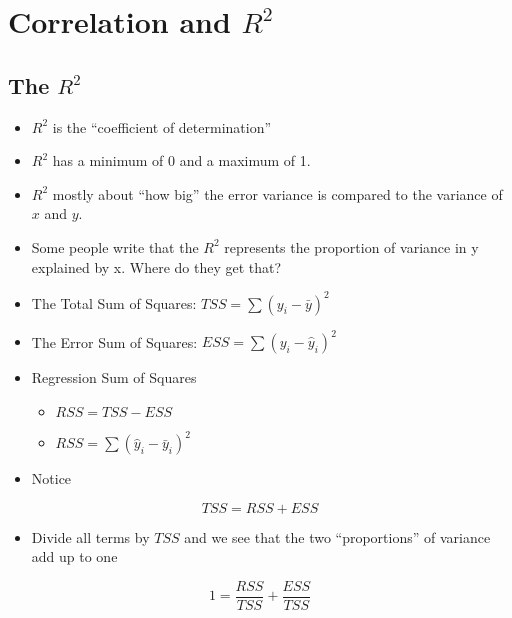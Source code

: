 \documentclass[10pt,english]{beamer}
\def\lyxframeend{} %
\begin{document}
\lyxframeend{}\section{Correlation and $R^{2}$}


\lyxframeend{}\subsection{The $R^{2}$}


\lyxframeend{}
\begin{itemize}
\item $R^{2}$ is the ``coefficient of determination'' 
\item $R^{2}$ has a minimum of 0 and a maximum of 1.
\item $R^{2}$ mostly about ``how big'' the error variance is compared
to the variance of $x$ and $y$.
\end{itemize}

\lyxframeend{}
\begin{itemize}
\item Some people write that the $R^{2}$ represents the proportion of variance
in y explained by x. Where do they get that?
\item The Total Sum of Squares: $TSS=\sum(y_{i}-\bar{y})^{2}$
\item The Error Sum of Squares: $ESS=\sum(y_{i}-\hat{y}_{i})^{2}$
\item Regression Sum of Squares

\begin{itemize}
\item $RSS=TSS-ESS$
\item $RSS=\sum(\hat{y}_{i}-\bar{y}_{i})^{2}$
\end{itemize}
\end{itemize}

\lyxframeend{}
\begin{itemize}
\item Notice
\end{itemize}
\[
TSS=RSS+ESS
\]

\begin{itemize}
\item Divide all terms by $TSS$ and we see that the two ``proportions''
of variance add up to one
\end{itemize}
\[
1=\frac{RSS}{TSS}+\frac{ESS}{TSS}
\]
\end{document}
